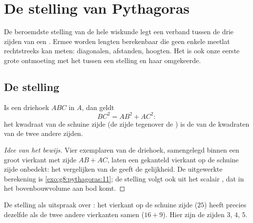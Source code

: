 \chapter{De stelling van Pythagoras}\label{ch:g8:pythagoras}

De beroemdste stelling van de hele wiskunde legt een verband tussen de drie
zijden van een . Ermee worden lengten berekenbaar die geen
enkele meetlat rechtstreeks kan meten: diagonalen, afstanden, hoogten. Het is
ook onze eerste grote ontmoeting met het  tussen een stelling en haar
omgekeerde.

\section{De stelling}

\begin{theorem}[Pythagoras]\label{thm:g8:pythagoras:direct}
Is een driehoek $ABC$  in $A$, dan geldt
\[
BC^2 = AB^2 + AC^2 :
\]
het kwadraat van de schuine zijde (de zijde tegenover de ) is de 
van de kwadraten van de twee andere zijden.
\end{theorem}

\begin{proof}[Idee van het bewijs]
Vier exemplaren van de driehoek, samengelegd binnen een groot vierkant met zijde
$AB + AC$, laten een gekanteld vierkant op de schuine zijde onbedekt: het
vergelijken van de  geeft de gelijkheid. De uitgewerkte berekening is
\cref{exo:g8:pythagoras:11}; de stelling volgt ook uit het scalair , dat
in het bovenbouwvolume aan bod komt.
\end{proof}

\begin{omfigure}

{\small De stelling als uitspraak over : het vierkant op de schuine
zijde ($25$) heeft precies dezelfde  als de twee andere vierkanten
samen ($16 + 9$). Hier zijn de zijden $3$, $4$, $5$.}
\end{omfigure}

